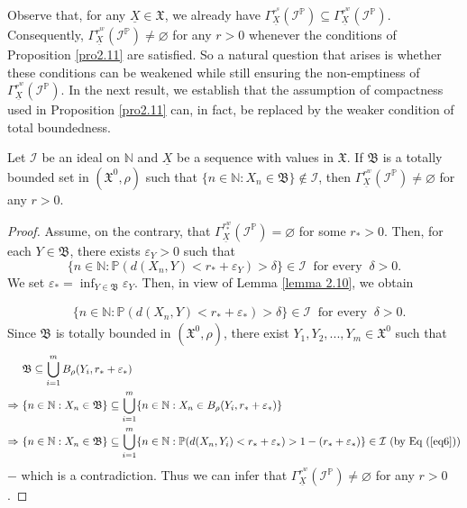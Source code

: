 \documentclass[reqno]{amsart}
\begin{document}
Observe that, for any $\underline{X}\in\mathfrak{X}$, we already have $\Gamma^{r^s}_{\underline{X}}(\mathcal{I}^{\mathbb{P}})\subseteq \Gamma^{r^w}_{\underline{X}}(\mathcal{I}^{\mathbb{P}})$. Consequently, $\Gamma^{r^w}_{\underline{X}}(\mathcal{I}^{\mathbb{P}})\neq\varnothing$ for any $r>0$ whenever the conditions of Proposition \ref{pro2.11} are satisfied. So
a natural question that arises is whether these conditions can be weakened while still ensuring the non-emptiness of $\Gamma^{r^w}_{\underline{X}}(\mathcal{I}^{\mathbb{P}})$. In the next result, we establish that the assumption of compactness used in Proposition \ref{pro2.11} can, in fact, be replaced by the weaker condition of total boundedness.
\begin{proposition}Let $\mathcal{I}$ be an ideal on $\mathbb{N}$ and $\underline{X}$ be a sequence with values in $\mathfrak{X}$.	If $\mathfrak{B}$ is a totally bounded set in $(\mathfrak{X}^0, \rho)$ such that $\{n \in \mathbb{N} : X_n \in \mathfrak{B}\} \notin \mathcal{I}$, then $\Gamma^{r^w}_{\underline{X}}(\mathcal{I}^{\mathbb{P}}) \neq \varnothing$ for any $r>0$.
\end{proposition}
\begin{proof}
	Assume, on the contrary, that $\Gamma^{r_*^w}_{\underline{X}}(\mathcal{I}^{\mathbb{P}})=\varnothing$ for some $r_*>0$. Then, for each $Y\in\mathfrak{B}$, there exists $\varepsilon_Y>0$ such that 
	\begin{equation*}
		\{n\in\mathbb{N}:\mathbb{P}(d(X_n,Y)<r_*+\varepsilon_Y)>\delta\}\in\mathcal{I}~\mbox{ for every }~\delta>0.
	\end{equation*}
	We set $\varepsilon_*=\displaystyle\inf_{Y\in\mathfrak{B}}\varepsilon_Y$.  Then, in view of Lemma \ref{lemma 2.10}, we obtain 
	
	\begin{align}\label{eq6}
		&\{n\in\mathbb{N}:\mathbb{P}(d(X_n,Y)<r_*+\varepsilon_*)>\delta\}\in\mathcal{I}~\mbox{ for every }~\delta>0.
	\end{align}
	Since $\mathfrak{B}$ is  totally bounded in $(\mathfrak{X}^0, \rho)$, there exist $Y_1,Y_2,...,Y_m\in \mathfrak{X}^0$ such that
	\begin{align*}\label{eq 3}
		&\mathfrak{B}\subseteq\bigcup_{i=1}^{m}B_{\rho}(Y_i,r_*+\varepsilon_*)\nonumber\\
		\Rightarrow~&	\{n\in\mathbb{N}:X_n\in\mathfrak{B}\}\subseteq\bigcup_{i=1}^{m}\{n\in\mathbb{N}:X_n\in B_{\rho}(Y_i,r_*+\varepsilon_*)\}\\
		\Rightarrow~&\{n\in\mathbb{N}:X_n\in\mathfrak{B}\}\subseteq\bigcup_{i=1}^{m}\{n\in\mathbb{N}:\mathbb{P}(d(X_n,Y_i)< r_*+\varepsilon_*)>1-(r_*+\varepsilon_*)\}\in\mathcal{I}~\mbox{(by Eq (\ref{eq6}))}
	\end{align*}
	$-$ which is a contradiction.
Thus we can infer that $\Gamma^{r^w}_{\underline{X}}(\mathcal{I}^{\mathbb{P}})\neq\varnothing$ for any $r>0$.
\end{proof}
\end{document}
